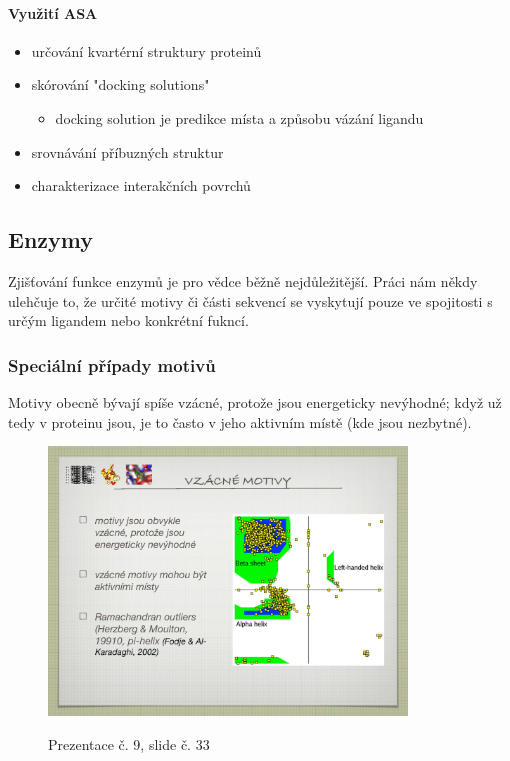 \documentclass[DIV=8]{scrreprt}
\begin{document}
\paragraph{Využití ASA}
\begin{itemize}[nosep]
    \item určování kvartérní struktury proteinů
    \item skórování "docking solutions"
\begin{itemize}[nosep]
    \item docking solution je predikce místa a způsobu vázání ligandu
\end{itemize}

    \item srovnávání příbuzných struktur
    \item charakterizace interakčních povrchů
\end{itemize}



\subsection{Enzymy} \label{Enzymy}


Zjišťování funkce enzymů je pro vědce běžně nejdůležitější. Práci nám někdy ulehčuje to, že určité motivy či části sekvencí se vyskytují pouze ve spojitosti s určým ligandem nebo konkrétní fukncí.

\subsubsection{Speciální případy motivů} \label{Speciální případy motivů}


Motivy obecně bývají spíše vzácné, protože jsou energeticky nevýhodné; když už tedy v proteinu jsou, je to často v jeho aktivním místě (kde jsou nezbytné). \begin{figure}
    \caption{Prezentace č. 9, slide č. 33}
    \includegraphics[width=0.85\textwidth]{slides-9/slide-33.jpg}
    \centering
    \label{slides-9-slide-33}
\end{figure}
\end{document}
